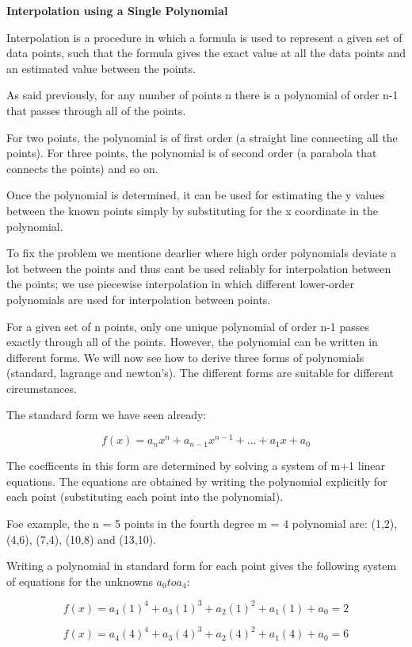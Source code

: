 \documentclass{article}
\begin{document}
\textbf{Interpolation using a Single Polynomial}

Interpolation is a procedure in which a formula is used to represent a given set of data points, such that the formula gives the exact value at all the data points and an estimated value between the points.

As said previously, for any number of points n there is a polynomial of order n-1 that passes through all of the points.

For two points, the polynomial is of first order (a straight line connecting all the points). For three points, the polynomial is of second order (a parabola that connects the points) and so on.

Once the polynomial is determined, it can be used for estimating the y values between the known points simply by substituting for the x coordinate in the polynomial.

To fix the problem we mentione dearlier where high order polynomials deviate a lot between the points and thus cant be used reliably for interpolation between the points; we use piecewise interpolation in which different lower-order polynomials are used for interpolation between points.

For a given set of n points, only one unique polynomial of order n-1 passes exactly through all of the points. However, the polynomial can be written in different forms. We will now see how to derive three forms of polynomials (standard, lagrange and newton's). The different forms are suitable for different circumstances.

The standard form we have seen already:

\[f(x) = a_nx^n + a_{n-1}x^{n-1} + ... + a_1x + a_0\]

The coefficents in this form are determined by solving a system of m+1 linear equations. The equations are obtained by writing the polynomial explicitly for each point (substituting each point into the polynomial).

Foe example, the n = 5 points in the fourth degree m = 4 polynomial are: (1,2), (4,6), (7,4), (10,8) and (13,10).

Writing a polynomial in standard form for each point gives the following system of equations for the unknowns $a_0 to a_4$:

\[f(x) = a_4(1)^4 + a_{3}(1)^{3} + a_2(1)^2 + a_1(1) + a_0 = 2\]

\[f(x) = a_4(4)^4 + a_{3}(4)^{3} + a_2(4)^2 + a_1(4) + a_0 = 6\]
\end{document}
